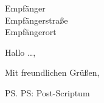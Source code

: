 \documentclass[ngerman]{scrlttr2}
\author{Autorname}
\begin{document}
	\begin{letter}{Empfänger\\Empfängerstraße\\Empfängerort}




		\opening{Hallo \dots,}

			\lipsum

		\closing{Mit freundlichen Grüßen,}

		\ps PS: Post-Scriptum

	\end{letter}
\end{document}
